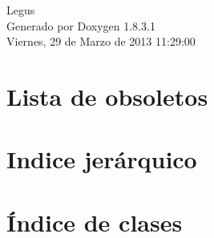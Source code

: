 \documentclass{book}
\begin{document}
\hypersetup{pageanchor=false,citecolor=blue}
\begin{titlepage}
\vspace*{7cm}
\begin{center}
{\Large Legus }\\
\vspace*{1cm}
{\large Generado por Doxygen 1.8.3.1}\\
\vspace*{0.5cm}
{\small Viernes, 29 de Marzo de 2013 11:29:00}\\
\end{center}
\end{titlepage}
\clearemptydoublepage
{}
\tableofcontents
\clearemptydoublepage
{}
\hypersetup{pageanchor=true,citecolor=blue}
\chapter{Lista de obsoletos}
\label{deprecated}
\hypertarget{deprecated}{}

\chapter{Indice jerárquico}

\chapter{Índice de clases}

\end{document}
